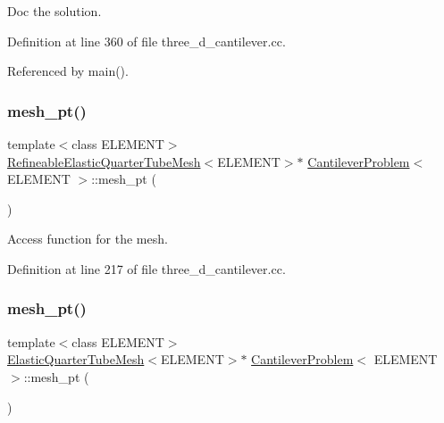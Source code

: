 Doc the solution. 



Definition at line 360 of file three\+\_\+d\+\_\+cantilever.\+cc.



Referenced by main().

\mbox{\label{classCantileverProblem_a20f03209a5031e1bda39da9f2d2ce845}} 
\subsubsection{\texorpdfstring{mesh\+\_\+pt()}{mesh\_pt()}\hspace{0.1cm}{\footnotesize\ttfamily [1/2]}}
{\footnotesize\ttfamily template$<$class E\+L\+E\+M\+E\+NT$>$ \\
\hyperlink{classRefineableElasticQuarterTubeMesh}{Refineable\+Elastic\+Quarter\+Tube\+Mesh}$<$E\+L\+E\+M\+E\+NT$>$$\ast$ \hyperlink{classCantileverProblem}{Cantilever\+Problem}$<$ E\+L\+E\+M\+E\+NT $>$\+::mesh\+\_\+pt (\begin{DoxyParamCaption}{ }\end{DoxyParamCaption})\hspace{0.3cm}{\ttfamily [inline]}}



Access function for the mesh. 



Definition at line 217 of file three\+\_\+d\+\_\+cantilever.\+cc.

\mbox{\label{classCantileverProblem_a3dd4b577c391a901e1568af225324282}} 
\subsubsection{\texorpdfstring{mesh\+\_\+pt()}{mesh\_pt()}\hspace{0.1cm}{\footnotesize\ttfamily [2/2]}}
{\footnotesize\ttfamily template$<$class E\+L\+E\+M\+E\+NT$>$ \\
\hyperlink{classElasticQuarterTubeMesh}{Elastic\+Quarter\+Tube\+Mesh}$<$E\+L\+E\+M\+E\+NT$>$$\ast$ \hyperlink{classCantileverProblem}{Cantilever\+Problem}$<$ E\+L\+E\+M\+E\+NT $>$\+::mesh\+\_\+pt (\begin{DoxyParamCaption}{ }\end{DoxyParamCaption})\hspace{0.3cm}{\ttfamily [inline]}}



